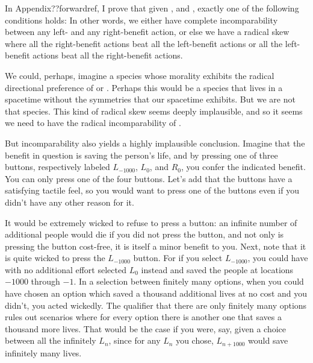 In Appendix??forwardref, I prove that given ,  and , exactly
one of the following conditions holds:
In other words, we either have complete incomparability between any left- and any right-benefit action, or else
we have a radical skew where all the right-benefit actions beat all the left-benefit actions or all the 
left-benefit actions beat all the right-benefit actions. 

We could, perhaps, imagine a species whose morality exhibits the radical directional preference 
of  or . Perhaps this would be a species that lives in a spacetime 
without the symmetries that our spacetime exhibits. But we are not that species. This kind of radical 
skew seems deeply implausible, and so it seems we need to have the radical incomparability of 
. 

But incomparability also yields a highly implausible conclusion. Imagine that the benefit in question
is saving the person's life, and by pressing one of three buttons,
respectively labeled $L_{-1000}$, $L_0$, and $R_0$, you confer the indicated benefit. 
You can only press one of the four buttons. Let's add that the buttons have a satisfying tactile feel, 
so you would want to press one of the buttons even if you didn't have any other reason for it. 

It would be extremely wicked to refuse to press a button: an infinite number of additional people would die if you 
did not press the button, and not only is pressing the button cost-free, it is itself a minor benefit to you.
Next, note that it is quite wicked to press the $L_{-1000}$ button. For if you select $L_{-1000}$, you could 
have with no additional effort selected $L_0$ instead and saved the people at locations $-1000$ through $-1$.
In a selection between finitely many options, when you could have chosen an option which saved a thousand 
additional lives at no cost and you didn't, you acted wickedly. The qualifier that there are only
finitely many options rules out scenarios where for every option there is another one that saves a thousand 
more lives. That would be the case if you were, say, given a choice between all the infinitely $L_n$, since
for any $L_n$ you chose, $L_{n+1000}$ would save infinitely many lives.

